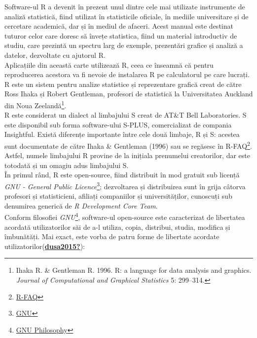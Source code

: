 \documentclass[
  11pt,
  b5paper,
  nottoc]{book}
\begin{document}
Software-ul \textsf{R} a devenit în prezent unul dintre cele mai
utilizate instrumente de analiză statistică, fiind utilizat în
statisticile oficiale, în mediile universitare și de cercetare
academică, dar și în mediul de afaceri. Acest manual este destinat
tuturor celor care doresc să învețe statistica, fiind un material
introductiv de studiu, care prezintă un spectru larg de exemple,
prezentări grafice și analiză a datelor, dezvoltate cu ajutorul
\textsf{R}.\\
Aplicațiile din această carte utilizează \textsf{R}, ceea ce înseamnă că
pentru reproducerea acestora va fi nevoie de instalarea \textsf{R} pe
calculatorul pe care lucrați.\\
\textsf{R} este un sistem pentru analize statistice și reprezentare
grafică creat de către Ross Ihaka și Robert Gentleman, profesori de
statistică la Universitatea Auckland din Noua
Zeelandă\footnote{Ihaka R. \& Gentleman R. 1996. R: a language for data analysis and graphics. {\it Journal of Computational and Graphical Statistics} 5: 299--314.}.\\
\textsf{R} este considerat un dialect al limbajului
\textsf{S} creat de AT\&T Bell Laboratories. \textsf{S} este disponibil
sub forma software-ului S-PLUS, comercializat de compania Insightful.
Există diferențe importante între cele două limbaje, \textsf{R} și
\textsf{S}: acestea sunt documentate de către Ihaka \& Gentleman (1996)
sau se regăsesc în
R-FAQ\footnote{\href{http://cran.r-project.org/doc/FAQ/R-FAQ.html\#What-are-the-differences-between-R-and-S_003f}{R-FAQ}}.\\
Astfel, numele limbajului R provine de la inițiala prenumelui
creatorilor, dar este totodată și un omagiu adus limbajului
\textsf{S}.\\
În primul rând, \textsf{R} este open-source, fiind distribuit în mod
gratuit sub licență
\textit{GNU - General Public Licence}\footnote{\href{http://www.gnu.org/}{GNU}};
dezvoltarea și distribuirea sunt în grija câtorva profesori și
statisticieni, afiliați companiilor și universităților, cunoscuți sub
denumirea generică de \textit{R Development Core Team}.\\
Conform filosofiei
\textit{GNU}\footnote{\href{http://www.gnu.org/philosophy/free-sw.ro.html\#exportcontrol}{GNU Philosophy}},
software-ul open-source este caracterizat de libertatea acordată
utilizatorilor săi de a-l utiliza, copia, distribui, studia, modifica și
îmbunătăți. Mai exact, este vorba de patru forme de libertate acordate
utilizatorilor(\protect\hyperlink{ref-dusa2015}{\textbf{dusa2015?}}):
\end{document}
